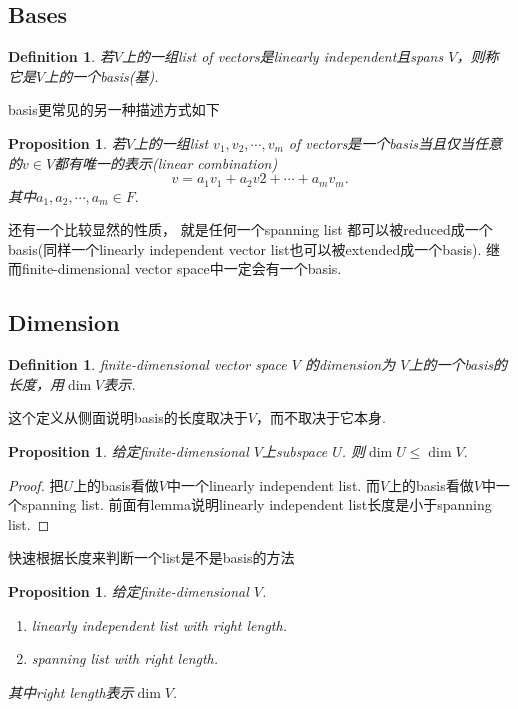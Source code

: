 \documentclass{article}
\newtheorem{proposition}[theorem]{Proposition}
\newtheorem{definition}[theorem]{Definition}
\begin{document}
\newpage
\subsection{Bases}

\begin{definition}
\rm 若$V$上的一组list of vectors是linearly independent且spans $V$，则称它是$V$上的一个basis(基).
\end{definition}


{\color{red} basis更常见的另一种描述方式如下}

\begin{proposition}
\rm 若$V$上的一组list $v_1,v_2,\cdots,v_m$ of vectors是一个basis当且仅当任意的$v \in V$都有唯一的表示(linear combination)
$$
v = a_1v_1 + a_2v2 + \cdots + a_mv_m.
$$ 
其中$a_1,a_2,\cdots,a_m \in F.$
\end{proposition}

还有一个比较显然的性质，{\color{blue} 就是任何一个spanning list 都可以被reduced成一个basis}(同样一个linearly independent vector list也可以被extended成一个basis). {\color{red} 继而finite-dimensional vector space中一定会有一个basis}.


\newpage
\subsection{Dimension}

\begin{definition}
\rm finite-dimensional vector space $V$ 的dimension为 $V$上的一个basis的长度，用$\dim{V}$表示.
\end{definition}

{\color{red} 这个定义从侧面说明basis的长度取决于$V$，而不取决于它本身}.

\begin{proposition}
\rm 给定finite-dimensional $V$上subspace $U$. 则$\dim{U} \leq \dim{V}.$
\end{proposition}

\begin{proof}
把$U$上的basis看做$V$中一个linearly independent list. 而$V$上的basis看做$V$中一个spanning list. 前面有lemma说明linearly independent list长度是小于spanning list.
\end{proof}

{\color{red} 快速根据长度来判断一个list是不是basis的方法}

\begin{proposition}
\rm 给定finite-dimensional $V$.
\begin{enumerate} 
	\item \rm linearly independent list with right length.
	\item \rm spanning list with right length.
\end{enumerate}
\rm 其中right length表示$\dim{V}$.
\end{proposition}
\end{document}
